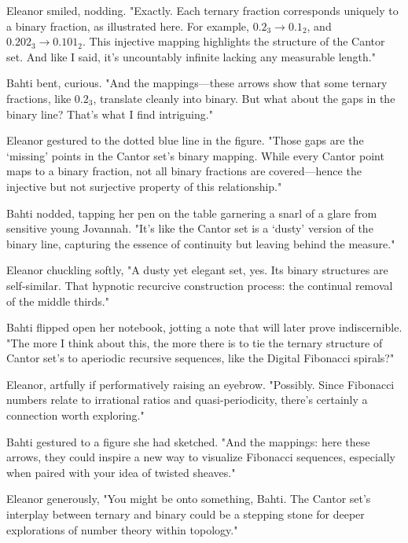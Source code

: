 Eleanor smiled, nodding. "Exactly. Each ternary fraction corresponds uniquely to a binary fraction, as illustrated here. For example, \(0.2_3 \rightarrow 0.1_2\), and \(0.202_3 \rightarrow 0.101_2\). This injective mapping highlights the structure of the Cantor set. And like I said, it’s uncountably infinite lacking any measurable length."

Bahti bent, curious. "And the mappings—these arrows show that some ternary fractions, like \(0.2_3\), translate cleanly into binary. But what about the gaps in the binary line? That’s what I find intriguing."

Eleanor gestured to the dotted blue line in the figure. "Those gaps are the ‘missing’ points in the Cantor set’s binary mapping. While every Cantor point maps to a binary fraction, not all binary fractions are covered—hence the injective but not surjective property of this relationship."

Bahti nodded, tapping her pen on the table garnering a snarl of a glare from sensitive young Jovannah. "It’s like the Cantor set is a ‘dusty’ version of the binary line, capturing the essence of continuity but leaving behind the measure."

Eleanor chuckling softly, "A dusty yet elegant set, yes. Its binary structures are self-similar. That hypnotic recurcive construction process: the continual removal of the middle thirds."

Bahti flipped open her notebook, jotting a note that will later prove indiscernible. "The more I think about this, the more there is to tie the ternary structure of Cantor set’s to aperiodic recursive sequences, like the Digital Fibonacci spirals?"

Eleanor, artfully if performatively raising an eyebrow. "Possibly. Since Fibonacci numbers relate to irrational ratios and quasi-periodicity, there’s certainly a connection worth exploring."

Bahti gestured to a figure she had sketched. "And the mappings: here these arrows, they could inspire a new way to visualize Fibonacci sequences, especially when paired with your idea of twisted sheaves."

Eleanor generously, "You might be onto something, Bahti. The Cantor set’s interplay between ternary and binary could be a stepping stone for deeper explorations of number theory within topology."

\begin{center}
\decofourleft \quad \decofourright
\end{center}

